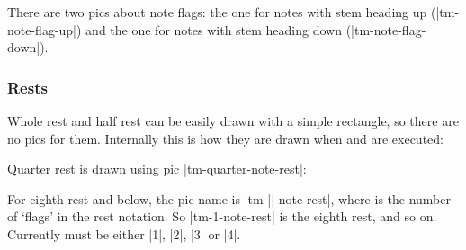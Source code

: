 \documentclass[11pt,a4paper]{ltxdoc}
\begin{document}
There are two pics about note flags: the one for notes with stem heading up 
(|tm-note-flag-up|) and the one for notes with stem heading down (|tm-note-flag-down|).

\begin{dispExample}
\end{dispExample}
\subsubsection{Rests}\label{sec:tikz:pic:rests}
Whole rest and half rest can be easily drawn with a simple rectangle, so there 
are no pics for them. Internally this is how they are drawn when 
 and  are executed:

\begin{dispExample}
\end{dispExample}

Quarter rest is drawn using pic |tm-quarter-note-rest|:

\begin{dispExample}
\end{dispExample}

For eighth rest and below, the pic name is |tm-||-note-rest|, 
where  is the number of `flags' in the rest notation. So 
|tm-1-note-rest| is the eighth rest, and so on. Currently  must be 
either |1|, |2|, |3| or |4|.

\begin{dispExample}
\end{dispExample}
\end{document}
